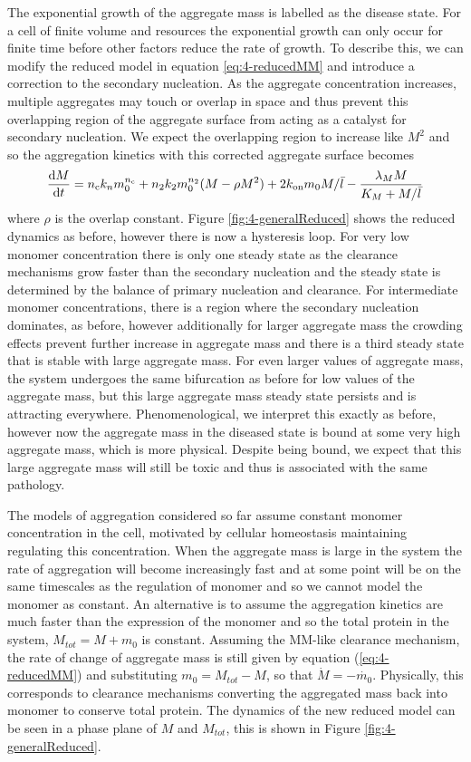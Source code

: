 The exponential growth of the aggregate mass is labelled as the disease state. For a cell of finite volume and resources the exponential growth can only occur for finite time before other factors reduce the rate of growth. To describe this, we can modify the reduced model in equation \ref{eq:4-reducedMM} and introduce a correction to the secondary nucleation. As the aggregate concentration increases, multiple aggregates may touch or overlap in space and thus prevent this overlapping region of the aggregate surface from acting as a catalyst for secondary nucleation. We expect the overlapping region to increase like $M^2$ and so the aggregation kinetics with this corrected aggregate surface becomes
\begin{equation}
\frac{\text{d}M}{\text{d}t}= n_{\mathrm{c}} k_n m_0^{n_{\mathrm{c}}} + n_2 k_2 m_0^{n_2} (M- \rho M^2) + 2 k_\text{on} m_0 M/\bar{l} - \frac{\lambda_M M}{K_M+M/\bar{l}}
\end{equation}
where $\rho$ is the overlap constant. Figure \ref{fig:4-generalReduced}  shows the reduced dynamics as before, however there is now a hysteresis loop. For very low monomer concentration there is only one steady state as the clearance mechanisms grow faster than the secondary nucleation and the steady state is determined by the balance of primary nucleation and clearance. For intermediate monomer concentrations, there is a region where the secondary nucleation dominates, as before, however additionally for larger aggregate mass the crowding effects prevent further increase in aggregate mass and there is a third steady state that is stable with large aggregate mass. For even larger values of aggregate mass, the system undergoes the same bifurcation as before for low values of the aggregate mass, but this large aggregate mass steady state persists and is attracting everywhere. Phenomenological, we interpret this exactly as before, however now the aggregate mass in the diseased state is bound at some very high aggregate mass, which is more physical. Despite being bound, we expect that this large aggregate mass will still be toxic and thus is associated with the same pathology.


The models of aggregation considered so far assume constant monomer concentration in the cell, motivated by cellular homeostasis maintaining regulating this concentration. When the aggregate mass is large in the system the rate of aggregation will become increasingly fast and at some point will be on the same timescales as the regulation of monomer and so we cannot model the monomer as constant. An alternative is to assume the aggregation kinetics are much faster than the expression of the monomer and so the total protein in the system, $M_{tot} = M + m_0$ is constant. Assuming the MM-like clearance mechanism, the rate of change of aggregate mass is still given by equation (\ref{eq:4-reducedMM}) and substituting $m_0=M_{tot}-M$, so that $\dot{M}=-\dot{m_0}$. Physically, this corresponds to clearance mechanisms converting the aggregated mass back into monomer to conserve total protein. The dynamics of the new reduced model can be seen in a phase plane of $M$ and $M_{tot}$, this is shown in  Figure \ref{fig:4-generalReduced}.

